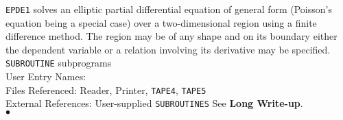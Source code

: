                          
                      
                    
                        
{\tt EPDE1} solves an elliptic partial differential equation of
general form
(Poisson's equation being a special case) over a two-dimensional region
using a finite difference method. The region may be of any shape and
on its boundary either the dependent variable or a relation involving its
derivative may be specified.
\Structure
{\tt SUBROUTINE} subprograms \\
User Entry Names: \\
Files Referenced: Reader, Printer, {\tt TAPE4}, {\tt TAPE5}\\
External References: User-supplied {\tt SUBROUTINES}
\Usage
See {\bf Long Write-up}.
\\ $\bullet$
